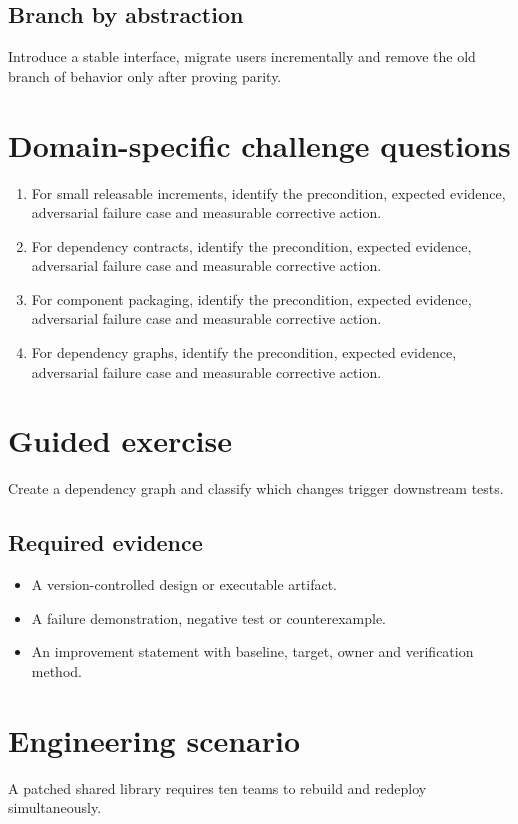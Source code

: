 \documentclass[10pt,letterpaper]{article}
\begin{document}
\subsection{Branch by abstraction}
Introduce a stable interface, migrate users incrementally and remove the old branch of behavior only after proving parity.

\section{Domain-specific challenge questions}
\begin{enumerate}
\item For small releasable increments, identify the precondition, expected evidence, adversarial failure case and measurable corrective action.
\item For dependency contracts, identify the precondition, expected evidence, adversarial failure case and measurable corrective action.
\item For component packaging, identify the precondition, expected evidence, adversarial failure case and measurable corrective action.
\item For dependency graphs, identify the precondition, expected evidence, adversarial failure case and measurable corrective action.
\end{enumerate}
\section{Guided exercise}
Create a dependency graph and classify which changes trigger downstream tests.

\subsection{Required evidence}
\begin{itemize}
\item A version-controlled design or executable artifact.
\item A failure demonstration, negative test or counterexample.
\item An improvement statement with baseline, target, owner and verification method.
\end{itemize}


\section{Engineering scenario}
A patched shared library requires ten teams to rebuild and redeploy simultaneously.
\end{document}
